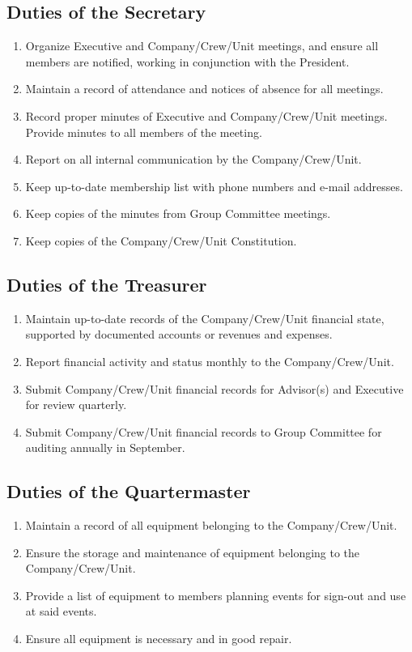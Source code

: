 \subsection{Duties of the Secretary}\label{subsec:duties-of-the-secretary}
\begin{enumerate}
    \item Organize Executive and Company/Crew/Unit meetings, and ensure all members are notified, working in conjunction with the President.
    \item Maintain a record of attendance and notices of absence for all meetings.
    \item Record proper minutes of Executive and Company/Crew/Unit meetings.
    Provide minutes to all members of the meeting.
    \item Report on all internal communication by the Company/Crew/Unit.
    \item Keep up-to-date membership list with phone numbers and e-mail addresses.
    \item Keep copies of the minutes from Group Committee meetings.
    \item Keep copies of the Company/Crew/Unit Constitution.
\end{enumerate}

\subsection{Duties of the Treasurer}\label{subsec:duties-of-the-treasurer}
\begin{enumerate}
    \item Maintain up-to-date records of the Company/Crew/Unit financial state, supported by documented accounts or revenues and expenses.
    \item Report financial activity and status monthly to the Company/Crew/Unit.
    \item Submit Company/Crew/Unit financial records for Advisor(s) and Executive for review quarterly.
    \item Submit Company/Crew/Unit financial records to Group Committee for auditing annually in September.
\end{enumerate}

\subsection{Duties of the Quartermaster}\label{subsec:duties-of-the-quartermaster}
\begin{enumerate}
    \item Maintain a record of all equipment belonging to the Company/Crew/Unit.
    \item Ensure the storage and maintenance of equipment belonging to the Company/Crew/Unit.
    \item Provide a list of equipment to members planning events for sign-out and use at said events.
    \item Ensure all equipment is necessary and in good repair.
\end{enumerate}


